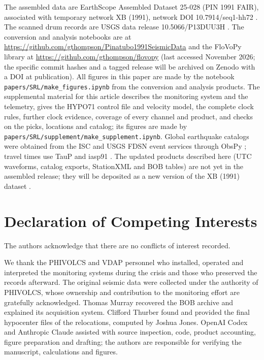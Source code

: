 \documentclass[linenum]{SSA-SRL}
\newcommand{\file}[1]{\texttt{#1}}
\begin{document}
\begin{datres}
The assembled data are EarthScope Assembled Dataset 25-028 (PIN 1991 FAIR), associated with temporary network XB (1991), network DOI 10.7914/seq1-hh72 \citep{XB_1991}. The scanned drum records are USGS data release 10.5066/P13DUU3H \citep{Power_2025}. The conversion and analysis notebooks are at \url{https://github.com/gthompson/Pinatubo1991SeismicData} and the FloVoPy library at \url{https://github.com/gthompson/flovopy} (last accessed November 2026; the specific commit hashes and a tagged release will be archived on Zenodo with a DOI at publication). All figures in this paper are made by the notebook \file{papers/SRL/make\_figures.ipynb} from the conversion and analysis products. The supplemental material for this article describes the monitoring system and the telemetry, gives the HYPO71 control file and velocity model, the complete clock rules, further clock evidence, coverage of every channel and product, and checks on the picks, locations and catalog; its figures are made by \file{papers/SRL/supplement/make\_supplement.ipynb}. Global earthquake catalogs were obtained from the ISC \citep{ISC_2024} and USGS \citep{USGS_2017} FDSN event services through ObsPy \citep{Beyreuther_2010,Krischer_2015}; travel times use TauP \citep{Crotwell_1999} and iasp91 \citep{Kennett_1991}. The updated products described here (UTC waveforms, catalog exports, StationXML and BOB tables) are not yet in the assembled release; they will be deposited as a new version of the XB (1991) dataset \citep{XB_1991}.
\end{datres}

\section{Declaration of Competing Interests}

The authors acknowledge that there are no conflicts of interest recorded.

\begin{ack}
We thank the PHIVOLCS and VDAP personnel who installed, operated and interpreted the monitoring systems during the crisis and those who preserved the records afterward. The original seismic data were collected under the authority of PHIVOLCS, whose ownership and contribution to the monitoring effort are gratefully acknowledged. Thomas Murray recovered the BOB archive and explained its acquisition system. Clifford Thurber found and provided the final hypocenter files of the \citet{Jones_2001} relocations, computed by Joshua Jones. OpenAI Codex and Anthropic Claude assisted with source inspection, code, product accounting, figure preparation and drafting; the authors are responsible for verifying the manuscript, calculations and figures.
\end{ack}


\end{document}
